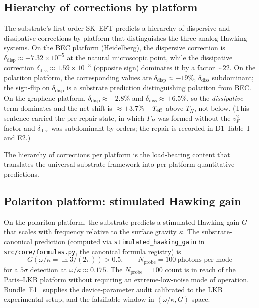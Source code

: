 \documentclass[aps,prd,reprint,nofootinbib,superscriptaddress]{revtex4-2}
\begin{document}
\subsection{Hierarchy of corrections by platform}

The substrate's first-order SK--EFT predicts a hierarchy of dispersive
and dissipative corrections by platform that distinguishes the three
analog-Hawking systems. On the BEC platform (Heidelberg), the
dispersive correction is $\delta_{\mathrm{disp}} \approx -7.32\times10^{-5}$
at the natural microscopic point, while the dissipative correction
$\delta_{\mathrm{diss}} \approx 1.59\times10^{-3}$ (opposite sign)
dominates it by a factor $\sim 22$. On the polariton
platform, the corresponding values are $\delta_{\mathrm{disp}} \approx
-19\%$, $\delta_{\mathrm{diss}}$ subdominant; the sign-flip on
$\delta_{\mathrm{disp}}$ is a substrate prediction distinguishing
polariton from BEC. On the graphene platform, $\delta_{\mathrm{disp}}
\approx -2.8\%$ and $\delta_{\mathrm{diss}} \approx +6.5\%$, so the
\emph{dissipative} term dominates and the net shift is $\approx +3.7\%$
-- $T_{\rm eff}$ above $T_H$, not below. (This sentence carried the
pre-repair state, in which $\Gamma_H$ was formed without the $v_F^2$
factor and $\delta_{\mathrm{diss}}$ was subdominant by orders; the
repair is recorded in D1 Table~I and E2.)

The hierarchy of corrections per platform is the load-bearing content
that translates the universal substrate framework into per-platform
quantitative predictions.

\subsection{Polariton platform: stimulated Hawking gain}

On the polariton platform, the substrate predicts a stimulated-Hawking
gain $G$ that scales with frequency relative to the surface gravity
$\kappa$. The substrate-canonical prediction (computed via
\texttt{stimulated\_hawking\_gain} in \texttt{src/core/formulas.py},
the canonical formula registry) is
\begin{equation}
  G(\omega/\kappa = \ln 3 / (2\pi)) > 0.5,
  \qquad N_{\mathrm{probe}} = 100\ \text{photons per mode}
\end{equation}
for a $5\sigma$ detection at $\omega/\kappa \approx 0.175$. The
$N_{\mathrm{probe}} = 100$ count is in reach of the Paris--LKB platform
without requiring an extreme-low-noise mode of operation.
Bundle~E1~\cite{Roehm2026E1} supplies the device-parameter audit
calibrated to the LKB experimental setup, and the falsifiable
window in $(\omega/\kappa, G)$ space.
\end{document}
